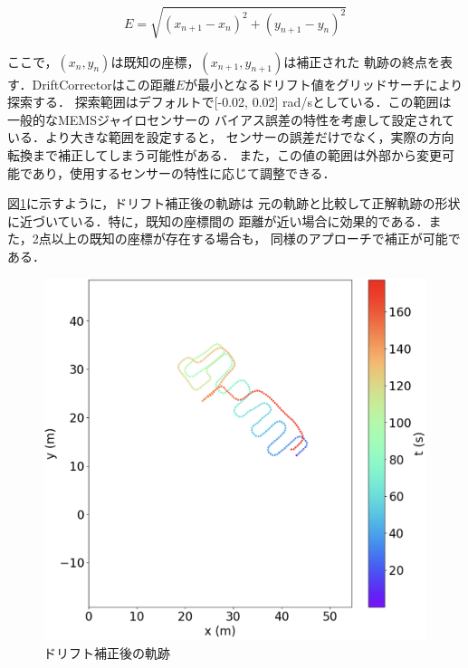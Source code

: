 \begin{equation}
    E = \sqrt{(x_{n+1} - x_n)^2 + (y_{n+1} - y_n)^2}
\end{equation}

ここで，$(x_n, y_n)$は既知の座標，$(x_{n+1}, y_{n+1})$は補正された
軌跡の終点を表す．DriftCorrectorはこの距離$E$が最小となるドリフト値をグリッドサーチにより探索する．
探索範囲はデフォルトで[-0.02, 0.02] rad/sとしている．この範囲は一般的なMEMSジャイロセンサーの
バイアス誤差の特性を考慮して設定されている．より大きな範囲を設定すると，
センサーの誤差だけでなく，実際の方向転換まで補正してしまう可能性がある．
また，この値の範囲は外部から変更可能であり，使用するセンサーの特性に応じて調整できる．


図\ref{fig:pdr-remove-drift}に示すように，ドリフト補正後の軌跡は
元の軌跡と比較して正解軌跡の形状に近づいている．特に，既知の座標間の
距離が近い場合に効果的である．また，2点以上の既知の座標が存在する場合も，
同様のアプローチで補正が可能である．

\begin{figure}[H]
	\centering
	\includegraphics[width=\linewidth]{../image/pdr-remove-drift-two.jpg}
	\caption{ドリフト補正後の軌跡}    \label{fig:pdr-remove-drift}
\end{figure}

